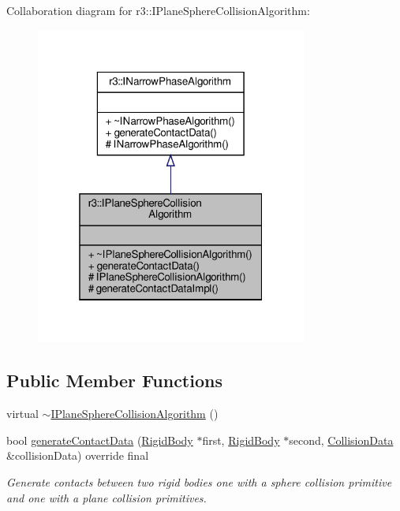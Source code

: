 Collaboration diagram for r3\+:\+:I\+Plane\+Sphere\+Collision\+Algorithm\+:\nopagebreak
\begin{figure}[H]
\begin{center}
\leavevmode
\includegraphics[width=253pt]{classr3_1_1_i_plane_sphere_collision_algorithm__coll__graph}
\end{center}
\end{figure}
\subsection*{Public Member Functions}
\begin{DoxyCompactItemize}
\item 
virtual \mbox{\hyperlink{classr3_1_1_i_plane_sphere_collision_algorithm_a25bd94a472e466de011c128012b8e938}{$\sim$\+I\+Plane\+Sphere\+Collision\+Algorithm}} ()
\item 
bool \mbox{\hyperlink{classr3_1_1_i_plane_sphere_collision_algorithm_a5b1c334d90d381e089d59cb59a7714c5}{generate\+Contact\+Data}} (\mbox{\hyperlink{classr3_1_1_rigid_body}{Rigid\+Body}} $\ast$first, \mbox{\hyperlink{classr3_1_1_rigid_body}{Rigid\+Body}} $\ast$second, \mbox{\hyperlink{classr3_1_1_collision_data}{Collision\+Data}} \&collision\+Data) override final
\begin{DoxyCompactList}\small\item\em Generate contacts between two rigid bodies one with a sphere collision primitive and one with a plane collision primitives. \end{DoxyCompactList}\end{DoxyCompactItemize}
